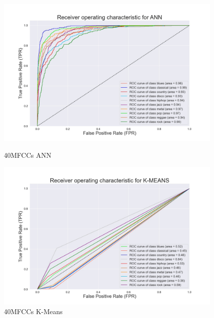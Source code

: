 \documentclass[conference]{IEEEtran}
\begin{document}
\begin{figure}[!ht]
\begin{center}
\begin{minipage}[t]{.24\textwidth}
        \end{minipage}
        \begin{minipage}[t]{.24\textwidth}
            \centering
            \includegraphics[width=\textwidth]{plot/SL/all_features/40/ANN_40MFCC_10000_10GEN_GTZAN - ROC Plot.jpg}
            \caption{40MFCCs ANN}
            \label{fig:40MFCCs ANN Time+frequency Features}
        \end{minipage}
        \begin{minipage}[t]{.24\textwidth}
            \centering
            \includegraphics[width=\textwidth]{plot/UL/all_features/40/40MFCC_10000_10GEN_GTZAN - ROC Plot.jpg}
            \caption{40MFCCs K-Means}
            \label{fig:40MFCCs K-Means Time+frequency Features}
        \end{minipage}
    \end{center}
\end{figure}
\end{document}
